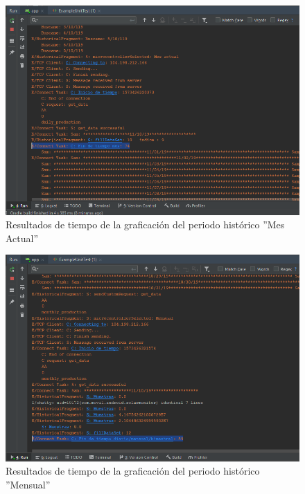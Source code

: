 \begin{figure}[H]
	\centering
	\includegraphics[scale=.6]{Capitulo5/images/TiempoGraficacionMesActual.png}
	\caption{Resultados de tiempo de la graficación del periodo histórico ''Mes Actual''}	\label{fig:Tiempo_GraficacionHMesActual}
\end{figure} 
\begin{figure}[H]
	\centering
	\includegraphics[scale=.6]{Capitulo5/images/TiempoGraficacionMensual.png}
	\caption{Resultados de tiempo de la graficación del periodo histórico ''Mensual''}	\label{fig:Tiempo_GraficacionHMensual}
\end{figure} 
